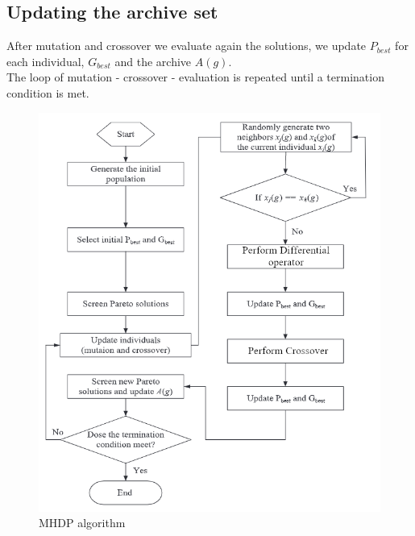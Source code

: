\subsection{Updating the archive set}
After mutation and crossover we evaluate again the solutions, we update $P_{best}$ for each individual, $G_{best}$ and the archive $A(g)$.\\
The loop of mutation - crossover - evaluation is repeated until a termination condition is met.
\begin{figure}
    \includegraphics[width=\linewidth]{Images/mhdp_algo.png}
    \caption{MHDP algorithm}
    \label{fig:mhdp}
\end{figure}
